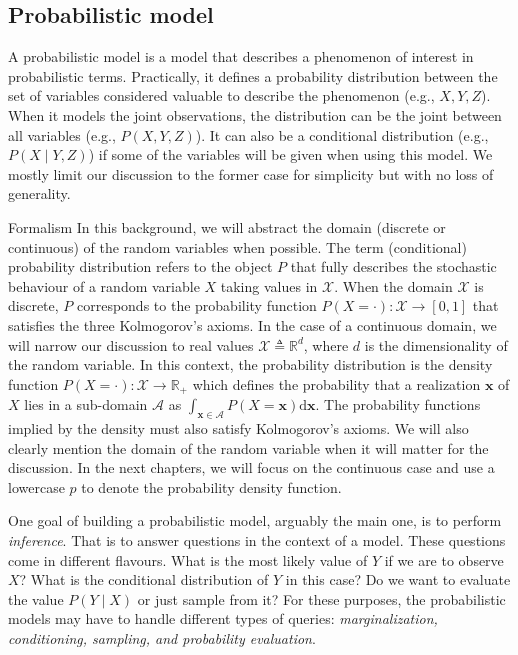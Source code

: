\subsection{Probabilistic model}
A probabilistic model is a model that describes a phenomenon of interest in probabilistic terms. Practically, it defines a probability distribution between the set of variables considered valuable to describe the phenomenon (e.g., $X, Y, Z$). When it models the joint observations, the distribution can be the joint between all variables (e.g., $P(X, Y, Z)$). It can also be a conditional distribution  (e.g., $P(X \mid Y, Z)$) if some of the variables will be given when using this model. We mostly limit our discussion to the former case for simplicity but with no loss of generality.

\begin{side_note}{Formalism}
  In this background, we will abstract the domain (discrete or continuous) of the random variables when possible. The term (conditional) probability distribution refers to the object $P$ that fully describes the stochastic behaviour of a random variable $X$ taking values in $\mathcal{X}$. When the domain $\mathcal{X}$ is discrete, $P$ corresponds to the probability function $P(X=\cdot): \mathcal{X} \rightarrow \left[0, 1 \right]$ that satisfies the three Kolmogorov's axioms. In the case of a continuous domain, we will narrow our discussion to real values $\mathcal{X} \triangleq \mathbb{R}^d$, where $d$ is the dimensionality of the random variable. In this context, the probability distribution is the density function $P(X=\cdot): \mathcal{X} \rightarrow \mathbb{R}_{+}$ which defines the probability that a realization $\bm{x}$ of $X$ lies in a sub-domain $\mathcal{A}$ as $\int_{\bm{x} \in \mathcal{A}} P(X=\bm{x}) \text{d} \bm{x}$. The probability functions implied by the density must also satisfy Kolmogorov's axioms. We will also clearly mention the domain of the random variable when it will matter for the discussion. In the next chapters, we will focus on the continuous case and use a lowercase $p$ to denote the probability density function.
\end{side_note}

One goal of building a probabilistic model, arguably the main one, is to perform \textit{inference}. That is to answer questions in the context of a model. These questions come in different flavours. What is the most likely value of $Y$ if we are to observe $X$? What is the conditional distribution of $Y$ in this case? Do we want to evaluate the value $P(Y \mid X)$ or just sample from it? For these purposes, the probabilistic models may have to handle different types of queries: \textit{marginalization, conditioning, sampling, and probability evaluation}.

